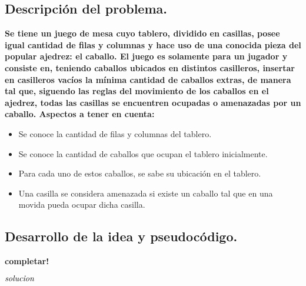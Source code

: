 \subsection{Descripción del problema.}

\vspace*{0.3cm}

\textbf{Se tiene un juego de mesa cuyo tablero, dividido en casillas, posee igual cantidad de filas y columnas y hace uso de una conocida pieza del popular ajedrez: el caballo. El juego es solamente para un jugador y consiste en, teniendo caballos ubicados en distintos casilleros, insertar en casilleros vacíos la mínima cantidad de caballos extras, de manera tal que, siguendo las reglas del movimiento de los caballos en el ajedrez, todas las casillas se encuentren ocupadas o amenazadas por un caballo.
Aspectos a tener en cuenta:
}

\begin{itemize}
   \item Se conoce la cantidad de filas y columnas del tablero.
   \item Se conoce la cantidad de caballos que ocupan el tablero inicialmente. 
   \item Para cada uno de estos caballos, se sabe su ubicación en el tablero.
   \item Una casilla se considera amenazada si existe un caballo tal que en una movida pueda ocupar dicha casilla.
\end{itemize}




\newpage
\subsection{Desarrollo de la idea y pseudocódigo.}

\vspace*{0.3cm}

\textbf{completar!}

\begin{codebox}
\li \Return $\id{solucion}$
\end{codebox}



